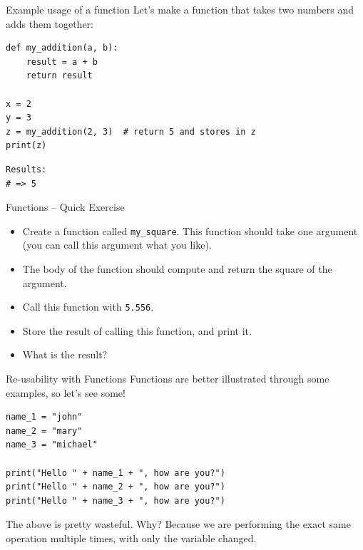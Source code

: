 \documentclass[10pt]{beamer}
\begin{document}
\begin{frame}[label={sec:orge07d515},fragile]{Example usage of a function}
 Let's make a function that takes two numbers and adds them together:

\begin{verbatim}
def my_addition(a, b):
    result = a + b
    return result

x = 2
y = 3
z = my_addition(2, 3)  # return 5 and stores in z
print(z)
\end{verbatim}

\begin{verbatim}
Results: 
# => 5
\end{verbatim}
\end{frame}

\begin{frame}[label={sec:org335efec},fragile]{Functions -- Quick Exercise}
 \begin{itemize}
\item Create a function called \texttt{my\_square}. This function should take one argument (you can
call this argument what you like).
\item The body of the function should compute and return the square of the argument.
\item Call this function with \texttt{5.556}.
\item Store the result of calling this function, and print it.
\item What is the result?
\end{itemize}
\end{frame}

\begin{frame}[label={sec:org8039205},fragile]{Re-usability with Functions}
 Functions are better illustrated through some examples, so let's see some!

\begin{verbatim}
name_1 = "john"
name_2 = "mary"
name_3 = "michael"

print("Hello " + name_1 + ", how are you?")
print("Hello " + name_2 + ", how are you?")
print("Hello " + name_3 + ", how are you?")
\end{verbatim}

The above is pretty wasteful. Why? Because we are performing the exact same
operation multiple times, with only the variable changed.
\end{frame}
\end{document}
